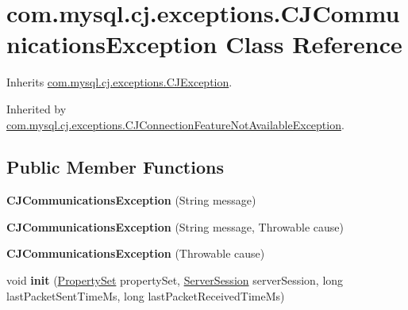 \hypertarget{classcom_1_1mysql_1_1cj_1_1exceptions_1_1_c_j_communications_exception}{}\section{com.\+mysql.\+cj.\+exceptions.\+C\+J\+Communications\+Exception Class Reference}
\label{classcom_1_1mysql_1_1cj_1_1exceptions_1_1_c_j_communications_exception}


Inherits \mbox{\hyperlink{classcom_1_1mysql_1_1cj_1_1exceptions_1_1_c_j_exception}{com.\+mysql.\+cj.\+exceptions.\+C\+J\+Exception}}.



Inherited by \mbox{\hyperlink{classcom_1_1mysql_1_1cj_1_1exceptions_1_1_c_j_connection_feature_not_available_exception}{com.\+mysql.\+cj.\+exceptions.\+C\+J\+Connection\+Feature\+Not\+Available\+Exception}}.

\subsection*{Public Member Functions}
\begin{DoxyCompactItemize}
\item 
\mbox{\label{classcom_1_1mysql_1_1cj_1_1exceptions_1_1_c_j_communications_exception_a623873673d9823008cbca292ae86b4f0}} 
{\bfseries C\+J\+Communications\+Exception} (String message)
\item 
\mbox{\label{classcom_1_1mysql_1_1cj_1_1exceptions_1_1_c_j_communications_exception_aa23238c40518f1c816cc78c8257f47ac}} 
{\bfseries C\+J\+Communications\+Exception} (String message, Throwable cause)
\item 
\mbox{\label{classcom_1_1mysql_1_1cj_1_1exceptions_1_1_c_j_communications_exception_a71694859bdad328921da71773ac7feb4}} 
{\bfseries C\+J\+Communications\+Exception} (Throwable cause)
\item 
\mbox{\label{classcom_1_1mysql_1_1cj_1_1exceptions_1_1_c_j_communications_exception_a95119012fe117d5a433a2f25e373b806}} 
void {\bfseries init} (\mbox{\hyperlink{interfacecom_1_1mysql_1_1cj_1_1conf_1_1_property_set}{Property\+Set}} property\+Set, \mbox{\hyperlink{interfacecom_1_1mysql_1_1cj_1_1protocol_1_1_server_session}{Server\+Session}} server\+Session, long last\+Packet\+Sent\+Time\+Ms, long last\+Packet\+Received\+Time\+Ms)
\end{DoxyCompactItemize}
